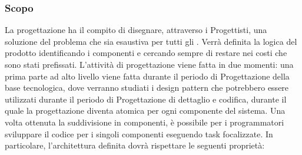 \subsubsection{Scopo}
La progettazione ha il compito di disegnare, attraverso i Progettisti, una soluzione del problema che sia esaustiva per tutti gli . Verrà definita la logica del prodotto identificando i componenti e cercando sempre di restare nei costi che sono stati prefissati.
L'attività di progettazione viene fatta in due momenti: una prima parte ad alto livello viene fatta durante il periodo di Progettazione della base tecnologica, dove verranno studiati i design pattern che potrebbero essere utilizzati durante il periodo di Progettazione di dettaglio e codifica, durante il quale la progettazione diventa atomica per ogni componente del sistema.\newline
Una volta ottenuta la suddivisione in componenti, è possibile per i programmatori sviluppare il codice per i singoli componenti eseguendo task focalizzate.
In particolare, l'architettura definita dovrà rispettare le seguenti proprietà:
